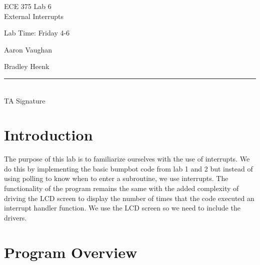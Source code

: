 \documentclass[12pt, letterpaper]{article}
\begin{document}
\begin{titlepage}
    \vspace*{4cm}
    \begin{flushright}
    {\huge
        ECE 375 Lab 6\\[1cm]
    }
    {\large
        External Interrupts
    }
    \end{flushright}
    \begin{flushleft}
    Lab Time: Friday 4-6
    \end{flushleft}
    \begin{flushright}
    Aaron Vaughan

    Bradley Heenk
    
    \vfill
    \rule{5in}{.5mm}\\
    TA Signature
    \end{flushright}

\end{titlepage}



\section{Introduction}

The purpose of this lab is to familiarize ourselves with the use of interrupts. We do this by implementing the basic bumpbot code from lab 1 and 2 but instead of using polling to know when to enter a subroutine, we use interrupts. The functionality of the program remains the same with the added complexity of driving the LCD screen to display the number of times that the code executed an interrupt handler function. We use the LCD screen so we need to include the drivers.


\section{Program Overview}
\end{document}
